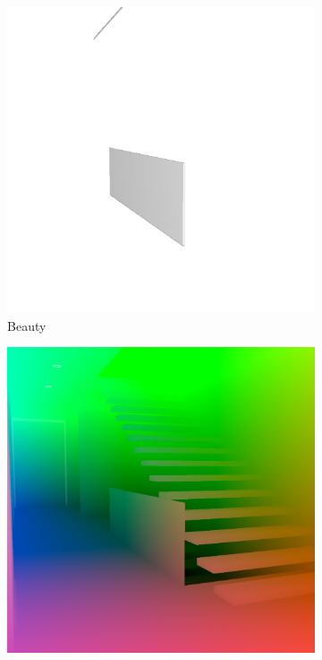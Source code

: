 \begin{figure}
	\centering
	\begin{subfigure}[t]{0.24\linewidth}
		\includegraphics[width=\textwidth]{chapters/chapter_thetool/beauty_scenepass2}
		\caption{Beauty}
		\label{beauty_scenepass2}
	\end{subfigure}
	\begin{subfigure}[t]{0.24\linewidth}
		\includegraphics[width=\textwidth]{chapters/chapter_thetool/worldpos_scenepass2}

\end{subfigure}
\end{figure}
